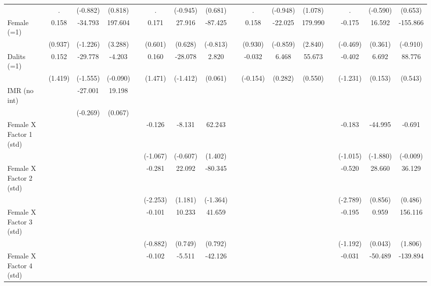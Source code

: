 {\begin{longtable}{@{\extracolsep{\fill}}lccccccccccccccc}
          & .     & (-0.882) & (0.818) &       & .     & (-0.945) & (0.681) &       & .     & (-0.948) & (1.078) &       & .     & (-0.590) & (0.653) \\
    Female (=1) & 0.158 & -34.793 & 197.604 &       & 0.171 & 27.916 & -87.425 &       & 0.158 & -22.025 & 179.990 &       & -0.175 & 16.592 & -155.866 \\
          & (0.937) & (-1.226) & (3.288) &       & (0.601) & (0.628) & (-0.813) &       & (0.930) & (-0.859) & (2.840) &       & (-0.469) & (0.361) & (-0.910) \\
    Dalits (=1) & 0.152 & -29.778 & -4.203 &       & 0.160 & -28.078 & 2.820 &       & -0.032 & 6.468 & 55.673 &       & -0.402 & 6.692 & 88.776 \\
          & (1.419) & (-1.555) & (-0.090) &       & (1.471) & (-1.412) & (0.061) &       & (-0.154) & (0.282) & (0.550) &       & (-1.231) & (0.153) & (0.543) \\
    IMR (no int) &       & -27.001 & 19.198 &       &       &       &       &       &       &       &       &       &       &       &  \\
          &       & (-0.269) & (0.067) &       &       &       &       &       &       &       &       &       &       &       &  \\
    Female X Factor 1 (std) &       &       &       &       & -0.126 & -8.131 & 62.243 &       &       &       &       &       & -0.183 & -44.995 & -0.691 \\
          &       &       &       &       & (-1.067) & (-0.607) & (1.402) &       &       &       &       &       & (-1.015) & (-1.880) & (-0.009) \\
    Female X Factor 2 (std) &       &       &       &       & -0.281 & 22.092 & -80.345 &       &       &       &       &       & -0.520 & 28.660 & 36.129 \\
          &       &       &       &       & (-2.253) & (1.181) & (-1.364) &       &       &       &       &       & (-2.789) & (0.856) & (0.486) \\
    Female X Factor 3 (std) &       &       &       &       & -0.101 & 10.233 & 41.659 &       &       &       &       &       & -0.195 & 0.959 & 156.116 \\
          &       &       &       &       & (-0.882) & (0.749) & (0.792) &       &       &       &       &       & (-1.192) & (0.043) & (1.806) \\
    Female X Factor 4 (std) &       &       &       &       & -0.102 & -5.511 & -42.126 &       &       &       &       &       & -0.031 & -50.489 & -139.894 \\

\end{longtable}}
